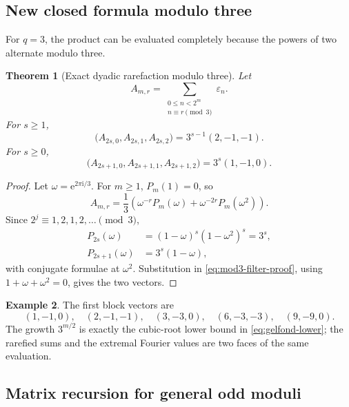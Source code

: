 \documentclass[11pt,oneside]{article}
\newtheorem{theorem}{Theorem}[section]
\theoremstyle{definition}
\newtheorem{example}[theorem]{Example}
\theoremstyle{remark}
\newcommand{\e}{\mathrm e}
\newcommand{\ii}{\mathrm i}
\newcommand{\eps}{\varepsilon}
\begin{document}
\subsection{New closed formula modulo three}

For $q=3$, the product can be evaluated completely because the powers of two
alternate modulo three.

\begin{theorem}[Exact dyadic rarefaction modulo three]\label{thm:mod3-rarefaction}
Let
\begin{equation}\label{eq:A-mr3}
 A_{m,r}=\sum_{\substack{0\le n<2^m\\n\equiv r\pmod3}}\eps_n.
\end{equation}
For $s\ge1$,
\begin{equation}\label{eq:mod3-even-block}
 \bigl(A_{2s,0},A_{2s,1},A_{2s,2}\bigr)
 =3^{s-1}(2,-1,-1).
\end{equation}
For $s\ge0$,
\begin{equation}\label{eq:mod3-odd-block}
 \bigl(A_{2s+1,0},A_{2s+1,1},A_{2s+1,2}\bigr)
 =3^s(1,-1,0).
\end{equation}
\end{theorem}

\begin{proof}
Let $\omega=\e^{2\pi\ii/3}$.  For $m\ge1$, $P_m(1)=0$, so
\begin{equation}\label{eq:mod3-filter-proof}
 A_{m,r}=\frac13\left(
  \omega^{-r}P_m(\omega)+\omega^{-2r}P_m(\omega^2)
 \right).
\end{equation}
Since $2^j\equiv1,2,1,2,\ldots\pmod3$,
\begin{align*}
 P_{2s}(\omega)
 &=(1-\omega)^s(1-\omega^2)^s=3^s,\\
 P_{2s+1}(\omega)
 &=3^s(1-\omega),
\end{align*}
with conjugate formulae at $\omega^2$.  Substitution in
\cref{eq:mod3-filter-proof}, using $1+\omega+\omega^2=0$, gives the two
vectors.
\end{proof}

\begin{example}
The first block vectors are
\[
 (1,-1,0),\quad(2,-1,-1),\quad(3,-3,0),\quad(6,-3,-3),
 \quad(9,-9,0).
\]
The growth $3^{m/2}$ is exactly the cubic-root lower bound in
\cref{eq:gelfond-lower}; the rarefied sums and the extremal Fourier values are
two faces of the same evaluation.
\end{example}

\subsection{Matrix recursion for general odd moduli}
\end{document}
